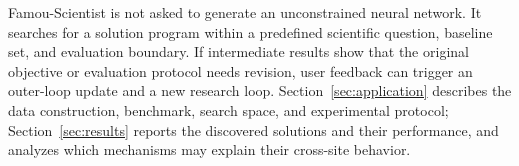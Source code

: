 Famou-Scientist is not asked to generate an unconstrained neural network. It searches for a solution program within a predefined scientific question, baseline set, and evaluation boundary. If intermediate results show that the original objective or evaluation protocol needs revision, user feedback can trigger an outer-loop update and a new research loop. Section~\ref{sec:application} describes the data construction, benchmark, search space, and experimental protocol; Section~\ref{sec:results} reports the discovered solutions and their performance, and analyzes which mechanisms may explain their cross-site behavior.
